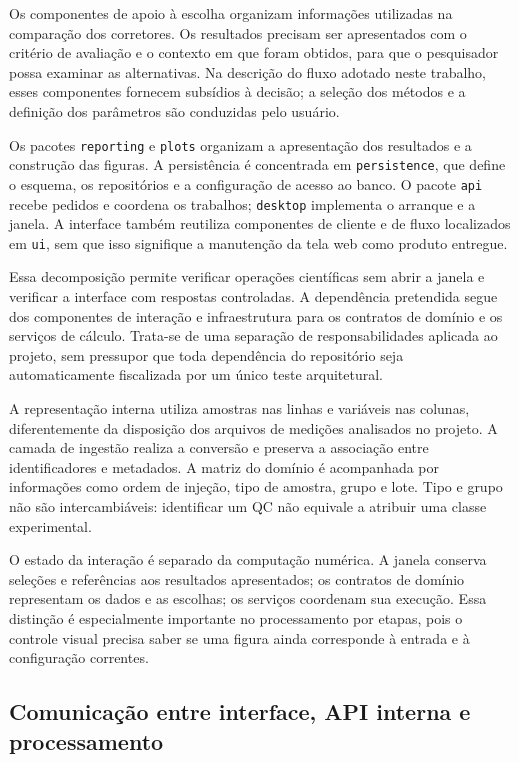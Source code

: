 Os componentes de apoio à escolha organizam informações utilizadas na comparação dos corretores. Os resultados precisam ser apresentados com o critério de avaliação e o contexto em que foram obtidos, para que o pesquisador possa examinar as alternativas. Na descrição do fluxo adotado neste trabalho, esses componentes fornecem subsídios à decisão; a seleção dos métodos e a definição dos parâmetros são conduzidas pelo usuário.

Os pacotes \texttt{reporting} e \texttt{plots} organizam a apresentação dos resultados e a construção das figuras. A persistência é concentrada em \texttt{persistence}, que define o esquema, os repositórios e a configuração de acesso ao banco. O pacote \texttt{api} recebe pedidos e coordena os trabalhos; \texttt{desktop} implementa o arranque e a janela. A interface também reutiliza componentes de cliente e de fluxo localizados em \texttt{ui}, sem que isso signifique a manutenção da tela web como produto entregue.

Essa decomposição permite verificar operações científicas sem abrir a janela e verificar a interface com respostas controladas. A dependência pretendida segue dos componentes de interação e infraestrutura para os contratos de domínio e os serviços de cálculo. Trata-se de uma separação de responsabilidades aplicada ao projeto, sem pressupor que toda dependência do repositório seja automaticamente fiscalizada por um único teste arquitetural.

A representação interna utiliza amostras nas linhas e variáveis nas colunas, diferentemente da disposição dos arquivos de medições analisados no projeto. A camada de ingestão realiza a conversão e preserva a associação entre identificadores e metadados. A matriz do domínio é acompanhada por informações como ordem de injeção, tipo de amostra, grupo e lote. Tipo e grupo não são intercambiáveis: identificar um QC não equivale a atribuir uma classe experimental.

O estado da interação é separado da computação numérica. A janela conserva seleções e referências aos resultados apresentados; os contratos de domínio representam os dados e as escolhas; os serviços coordenam sua execução. Essa distinção é especialmente importante no processamento por etapas, pois o controle visual precisa saber se uma figura ainda corresponde à entrada e à configuração correntes.

\subsection{Comunicação entre interface, API interna e processamento}

